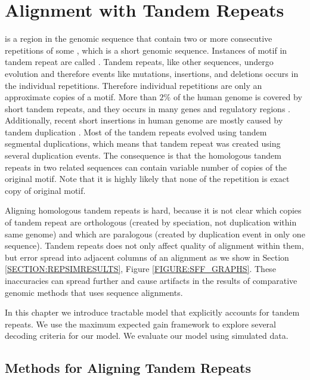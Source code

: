 \chapter{Alignment with Tandem Repeats}
 is a region in the genomic sequence that contain two
or more consecutive repetitions of some , which is a short
genomic sequence. Instances of motif in tandem repeat are called
.  Tandem repeats, like other sequences, undergo
evolution and therefore events like mutations, insertions, and deletions
occurs in the individual repetitions.  Therefore individual repetitions are only an approximate copies of a motif.
More than $2\%$ of the human genome is covered by short
tandem repeats, and they occurs in many genes and regulatory regions
\cite{Gemayel2010}. Additionally, recent short insertions in human genome are
mostly caused by tandem duplication \cite{Messer2007}. Most of the tandem
repeats evolved using tandem segmental duplications, which means that tandem
repeat was created using several duplication events. The consequence is that
the homologous tandem repeats in two related sequences can contain variable
number of copies of the original motif. Note that it is highly likely that none
of the repetition is exact copy of original motif.

Aligning homologous tandem repeats is hard, because it is not clear which
copies of tandem repeat are orthologous (created by speciation, not duplication
within same genome) and which are paralogous (created by duplication event in
only one sequence). Tandem repeats does not only affect quality of alignment
within them, but error spread into adjacent columns of an alignment as we show
in Section \ref{SECTION:REPSIMRESULTS}, Figure \ref{FIGURE:SFF_GRAPHS}.  These
inaccuracies can spread further and cause artifacts in the results of
comparative genomic methods that uses sequence alignments.

In this chapter we introduce tractable model that explicitly accounts for
tandem repeats. We use the maximum expected gain framework to explore several
decoding criteria for our model. We evaluate our model using simulated data. 

\section{Methods for Aligning Tandem Repeats}\label{SECTION:REPALNMETHODS}

